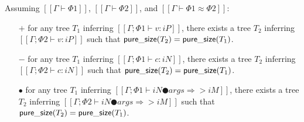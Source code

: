 \begin{lemma}
    Assuming $[[Γ ⊢ Φ1]]$, $[[Γ ⊢ Φ2]]$, and $[[Γ ⊢ Φ1 ≈ Φ2]]$:
    \begin{itemize}
        \item [$+$] 
            for any tree $T_1$ inferring $[[Γ ; Φ1 ⊢ v : iP]]$, 
            there exists a tree $T_2$ inferring $[[Γ ; Φ2 ⊢ v : iP]]$ such that 
            $\mathsf{pure\_size}(T_2) = \mathsf{pure\_size}(T_1)$.
        \item [$-$] 
            for any tree $T_1$ inferring $[[Γ ; Φ1 ⊢ c : iN]]$, 
            there exists a tree $T_2$ inferring $[[Γ ; Φ2 ⊢ c : iN]]$ such that 
            $\mathsf{pure\_size}(T_2) = \mathsf{pure\_size}(T_1)$.
        \item [$\bullet$] 
            for any tree $T_1$ inferring $[[Γ ; Φ1 ⊢ iN ● args ⇒> iM]]$, 
            there exists a tree $T_2$ inferring $[[Γ ; Φ2 ⊢ iN ● args ⇒> iM]]$ such that 
            $\mathsf{pure\_size}(T_2) = \mathsf{pure\_size}(T_1)$.
    \end{itemize}
\end{lemma}
